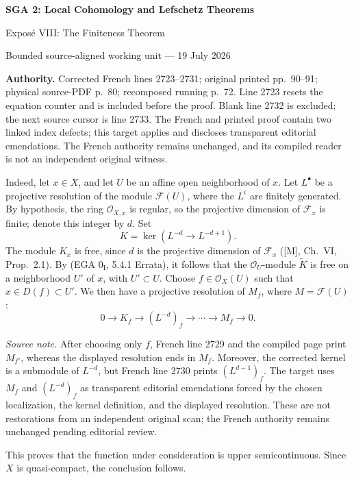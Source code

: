 \documentclass[10pt,a4paper]{article}
\newcommand{\cF}{\mathcal F}
\newcommand{\cO}{\mathcal O}
\begin{document}
\begin{center}
  {\Large\bfseries SGA 2: Local Cohomology and Lefschetz Theorems}\par\smallskip
  {\large Expos\'e VIII: The Finiteness Theorem}\par
  \small Bounded source-aligned working unit --- 19 July 2026
\end{center}
\noindent\colorbox{softgray}{\parbox{0.95\linewidth}{\footnotesize\textbf{Authority.}
Corrected French lines 2723--2731; original printed pp.~90--91; physical
source-PDF p.~80; recomposed running p.~72. Line 2723 resets the equation
counter and is included before the proof. Blank line 2732 is excluded; the
next source cursor is line 2733. The French and printed proof contain two
linked index defects; this target applies and discloses transparent editorial
emendations. The French authority remains unchanged, and its compiled reader
is not an independent original witness.}}

\setcounter{equation}{1}
\medskip
Indeed, let $x\in X$, and let $U$ be an affine open neighborhood of $x$.
Let $L^\bullet$ be a projective resolution of the module $\cF(U)$, where the
$L^i$ are finitely generated. By hypothesis, the ring $\cO_{X,x}$ is regular,
so the projective dimension of $\cF_x$ is finite; denote this integer by $d$.
Set
\[
  K=\ker(L^{-d}\longrightarrow L^{-d+1}).
\]
The module $K_x$ is free, since $d$ is the projective dimension of $\cF_x$
([M], Ch.~VI, Prop.~2.1). By (EGA $0_{\mathrm I}$, 5.4.1 Errata), it follows
that the $\cO_U$-module $\widetilde K$ is free on a neighborhood $U'$ of $x$,
with $U'\subset U$. Choose $f\in\cO_X(U)$ such that
$x\in D(f)\subset U'$. We then have a projective resolution of $M_f$, where
$M=\cF(U)$:
\[
  0\longrightarrow K_f\longrightarrow (L^{-d})_f\longrightarrow
  \cdots\longrightarrow M_f\longrightarrow 0.
\]

\noindent\emph{Source note.} After choosing only $f$, French line 2729 and
the compiled page print $M_{f'}$, whereas the displayed resolution ends in
$M_f$. Moreover, the corrected kernel is a submodule of $L^{-d}$, but French
line 2730 prints $(L^{d-1})_f$. The target uses $M_f$ and $(L^{-d})_f$ as
transparent editorial emendations forced by the chosen localization, the
kernel definition, and the displayed resolution. These are not restorations
from an independent original scan; the French authority remains unchanged
pending editorial review.

This proves that the function under consideration is upper semicontinuous.
Since $X$ is quasi-compact, the conclusion follows.
\end{document}
